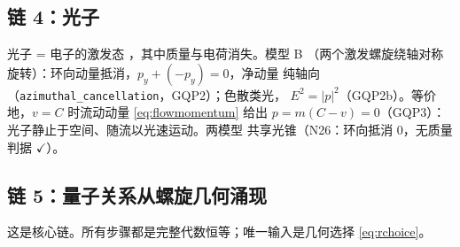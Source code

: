 \documentclass[aps,prd,preprint,superscriptaddress,amsmath,amssymb]{revtex4-2}
\begin{document}
\subsection{链 4：光子}
\label{app:chain4}

光子 = 电子的激发态 \cite{einstein1905erzeugung}，其中质量与电荷消失。模型 B
（两个激发螺旋绕轴对称旋转）：环向动量抵消，$p_y+(-p_y)=0$，净动量
纯轴向（\texttt{azimuthal\_cancellation}，GQP2）；色散类光，
$E^2=|p|^2$（GQP2b）。等价地，$v=C$ 时流动动量 \eqref{eq:flowmomentum}
给出 $p=m(C-v)=0$（GQP3）：光子静止于空间、随流以光速运动。两模型
共享光锥（N26：环向抵消 0，无质量判据 $\checkmark$）。

\subsection{链 5：量子关系从螺旋几何涌现}
\label{app:chain5}

这是核心链。所有步骤都是完整代数恒等；唯一输入是几何选择
\eqref{eq:rchoice}。
\end{document}
